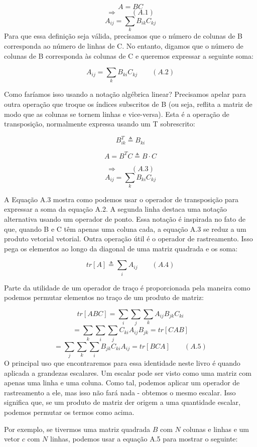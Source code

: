 \documentclass[
  12pt,
]{book}
\begin{document}
\[ A = BC \]
\[\Longrightarrow \qquad (A.1)\]
\[ A_{ij} = \sum_k B_{ik} C_{kj} \]
Para que essa definição seja válida, precisamos que o número de colunas de B corresponda ao número de linhas de C. No entanto, digamos que o número de colunas de B corresponda às colunas de C e queremos expressar a seguinte soma:

\[ A_{ij} = \sum_k B_{ki} C_{kj} \qquad (A.2) \]

Como faríamos isso usando a notação algébrica linear? Precisamos apelar para outra operação que troque os índices subscritos de B (ou seja, reflita a matriz de modo que as colunas se tornem linhas e vice-versa). Esta é a operação de transposição, normalmente expressa usando um T sobrescrito:

\[B_{ik}^T \triangleq B_{ki}\]

\[A=B^TC \triangleq B \cdot C\]

\[ \Longrightarrow \qquad (A.3)\]
\[A_{ij} = \sum_k B_{ki}C_{kj}\]

A Equação A.3 mostra como podemos usar o operador de transposição para expressar a soma da equação A.2. A segunda linha destaca uma notação alternativa usando um operador de ponto. Essa notação é inspirada no fato de que, quando B e C têm apenas uma coluna cada, a equação A.3 se reduz a um produto vetorial vetorial.
Outra operação útil é o operador de rastreamento. Isso pega os elementos ao longo da diagonal de uma matriz quadrada e os soma:

\[ tr[A] \triangleq \sum_i A_{ij} \qquad (A.4)\]

Parte da utilidade de um operador de traço é proporcionada pela maneira como podemos permutar elementos no traço de um produto de matriz:

\[ tr[ABC] = \sum_i \sum_j \sum_k A_{ij} B_{jk} C_{ki}\]
\[ = \sum_k \sum_i \sum_j C_{ki} A_{ij} B_{jk} = tr[CAB] \]
\[ = \sum_j \sum_k \sum_i B_{jk} C_{ki} A_{ij} = tr[BCA] \qquad (A.5) \]
O principal uso que encontraremos para essa identidade neste livro é quando aplicada a grandezas escalares. Um escalar pode ser visto como uma matriz com apenas uma linha e uma coluna. Como tal, podemos aplicar um operador de rastreamento a ele, mas isso não fará nada - obtemos o mesmo escalar. Isso significa que, se um produto de matriz der origem a uma quantidade escalar, podemos permutar os termos como acima.

Por exemplo, se tivermos uma matriz quadrada \(B\) com \(N\) colunas e linhas e um vetor \(c\) com \(N\) linhas, podemos usar a equação A.5 para mostrar o seguinte:
\end{document}
